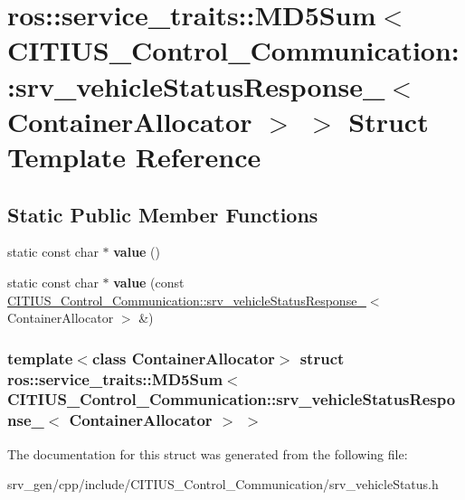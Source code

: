 \hypertarget{structros_1_1service__traits_1_1_m_d5_sum_3_01_c_i_t_i_u_s___control___communication_1_1srv__vehe68f4beca1dfa3f9831faef22dc91c74}{\section{ros\-:\-:service\-\_\-traits\-:\-:\-M\-D5\-Sum$<$ \-C\-I\-T\-I\-U\-S\-\_\-\-Control\-\_\-\-Communication\-:\-:srv\-\_\-vehicle\-Status\-Response\-\_\-$<$ \-Container\-Allocator $>$ $>$ \-Struct \-Template \-Reference}
\label{structros_1_1service__traits_1_1_m_d5_sum_3_01_c_i_t_i_u_s___control___communication_1_1srv__vehe68f4beca1dfa3f9831faef22dc91c74}
}
\subsection*{\-Static \-Public \-Member \-Functions}
\begin{DoxyCompactItemize}
\item 
\hypertarget{structros_1_1service__traits_1_1_m_d5_sum_3_01_c_i_t_i_u_s___control___communication_1_1srv__vehe68f4beca1dfa3f9831faef22dc91c74_ad296073ebe07b4a19b70a6534d640cde}{static const char $\ast$ {\bfseries value} ()}\label{structros_1_1service__traits_1_1_m_d5_sum_3_01_c_i_t_i_u_s___control___communication_1_1srv__vehe68f4beca1dfa3f9831faef22dc91c74_ad296073ebe07b4a19b70a6534d640cde}

\item 
\hypertarget{structros_1_1service__traits_1_1_m_d5_sum_3_01_c_i_t_i_u_s___control___communication_1_1srv__vehe68f4beca1dfa3f9831faef22dc91c74_acd0bfe13927b0684ea90af07be123b16}{static const char $\ast$ {\bfseries value} (const \hyperlink{struct_c_i_t_i_u_s___control___communication_1_1srv__vehicle_status_response__}{\-C\-I\-T\-I\-U\-S\-\_\-\-Control\-\_\-\-Communication\-::srv\-\_\-vehicle\-Status\-Response\-\_\-}$<$ \-Container\-Allocator $>$ \&)}\label{structros_1_1service__traits_1_1_m_d5_sum_3_01_c_i_t_i_u_s___control___communication_1_1srv__vehe68f4beca1dfa3f9831faef22dc91c74_acd0bfe13927b0684ea90af07be123b16}

\end{DoxyCompactItemize}
\subsubsection*{template$<$class Container\-Allocator$>$ struct ros\-::service\-\_\-traits\-::\-M\-D5\-Sum$<$ C\-I\-T\-I\-U\-S\-\_\-\-Control\-\_\-\-Communication\-::srv\-\_\-vehicle\-Status\-Response\-\_\-$<$ Container\-Allocator $>$ $>$}



\-The documentation for this struct was generated from the following file\-:\begin{DoxyCompactItemize}
\item 
srv\-\_\-gen/cpp/include/\-C\-I\-T\-I\-U\-S\-\_\-\-Control\-\_\-\-Communication/srv\-\_\-vehicle\-Status.\-h\end{DoxyCompactItemize}
